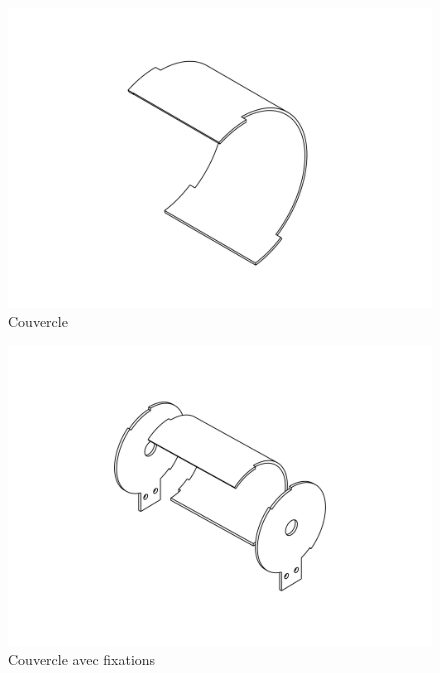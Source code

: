 \begin{figure}
    \centering
    \includegraphics[width=\textwidth]{Graphics/Roue/DRAWING_COUVERCLE.pdf}
    \caption{Couvercle}
\end{figure}

\begin{figure}
    \centering
    \includegraphics[width=\textwidth]{Graphics/Roue/DRAWING_COUVERCLE_DEMI_COMPLET.pdf}
    \caption{Couvercle avec fixations}
\end{figure}

